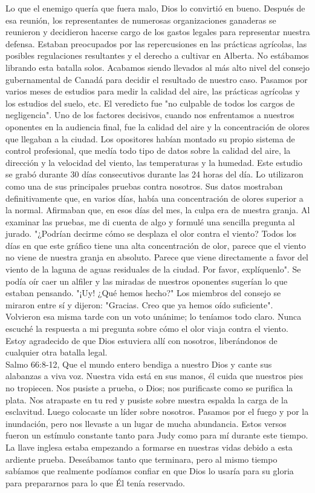 \documentclass[twoside, 12pt]{book}
\begin{document}
Lo que el enemigo quería que fuera malo, Dios lo convirtió en bueno. Después de esa reunión, los representantes de numerosas organizaciones ganaderas se reunieron y decidieron hacerse cargo de los gastos legales para representar nuestra defensa. Estaban preocupados por las repercusiones en las prácticas agrícolas, las posibles regulaciones resultantes y el derecho a cultivar en Alberta. No estábamos librando esta batalla solos. Acabamos siendo llevados al más alto nivel del consejo gubernamental de Canadá para decidir el resultado de nuestro caso. Pasamos por varios meses de estudios para medir la calidad del aire, las prácticas agrícolas y los estudios del suelo, etc. El veredicto fue "no culpable de todos los cargos de negligencia". Uno de los factores decisivos, cuando nos enfrentamos a nuestros oponentes en la audiencia final, fue la calidad del aire y la concentración de olores que llegaban a la ciudad. Los opositores habían montado su propio sistema de control profesional, que medía todo tipo de datos sobre la calidad del aire, la dirección y la velocidad del viento, las temperaturas y la humedad. Este estudio se grabó durante 30 días consecutivos durante las 24 horas del día. Lo utilizaron como una de sus principales pruebas contra nosotros. Sus datos mostraban definitivamente que, en varios días, había una concentración de olores superior a la normal. Afirmaban que, en esos días del mes, la culpa era de nuestra granja. Al examinar las pruebas, me di cuenta de algo y formulé una sencilla pregunta al jurado. "¿Podrían decirme cómo se desplaza el olor contra el viento? Todos los días en que este gráfico tiene una alta concentración de olor, parece que el viento no viene de nuestra granja en absoluto. Parece que viene directamente a favor del viento de la laguna de aguas residuales de la ciudad. Por favor, explíquenlo". Se podía oír caer un alfiler y las miradas de nuestros oponentes sugerían lo que estaban pensando. "¡Uy! ¿Qué hemos hecho?" Los miembros del consejo se miraron entre sí y dijeron: "Gracias. Creo que ya hemos oído suficiente". Volvieron esa misma tarde con un voto unánime; lo teníamos todo claro. Nunca escuché la respuesta a mi pregunta sobre cómo el olor viaja contra el viento. Estoy agradecido de que Dios estuviera allí con nosotros, liberándonos de cualquier otra batalla legal.\\

Salmo 66:8-12, Que el mundo entero bendiga a nuestro Dios y cante sus alabanzas a viva voz. Nuestra vida está en sus manos, él cuida que nuestros pies no tropiecen. Nos pusiste a prueba, o
Dios; nos purificaste como se purifica la plata. Nos atrapaste en tu red y pusiste sobre nuestra espalda la carga de la esclavitud. Luego colocaste un líder sobre nosotros. Pasamos por el fuego y por la inundación, pero nos llevaste a un lugar de mucha abundancia. Estos versos fueron un estímulo constante tanto para Judy como para mí durante este tiempo. La llave inglesa estaba empezando a formarse en nuestras vidas debido a esta ardiente prueba. Deseábamos tanto que terminara, pero al mismo tiempo sabíamos que realmente podíamos confiar en que Dios lo usaría para su gloria para prepararnos para lo que Él tenía reservado.\\
\end{document}
